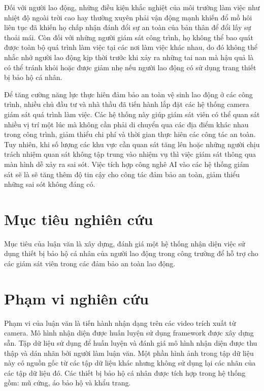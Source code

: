 Đối với người lao động, những điều kiện khắc nghiệt của môi trường làm việc như nhiệt độ ngoài trời cao hay thường xuyên phải vận động mạnh khiến đổ mồ hôi liên tục đã khiến họ chấp nhận đánh đổi sự an toàn của bản thân để đổi lấy sự thoải mái. Còn đối với những người giám sát công trình, họ không thể bao quát được toàn bộ quá trình làm việc tại các nơi làm việc khác nhau, do đó không thể nhắc nhở người lao động kịp thời trước khi xảy ra những tai nan mà hậu quả là có thể tránh khỏi hoặc được giảm nhẹ nếu người lao động có sử dụng trang thiết bị bảo hộ cá nhân.

Để tăng cường năng lực thực hiên đảm bảo an toàn vệ sinh lao động ở các công trình, nhiều chủ đầu tư và nhà thầu đã tiến hành lắp đặt các hệ thống camera giám sát quá trình làm việc. Các hệ thống này giúp giám sát viên có thể quan sát nhiều vị trí một lúc mà không cần phải di chuyển qua các địa điểm khác nhau trong công trình, giảm thiểu chi phí và thời gian thực hiên các công tác an toàn. Tuy nhiên, khi số lượng các khu vực cần quan sát tăng lên hoặc những người chịu trách nhiệm quan sát không tập trung vào nhiệm vụ  thì việc giám sát thông qua màn hình dễ xảy ra sai sót. Việc tích hợp công nghê AI vào các hệ thống giám sát sẽ là sẽ tăng thêm độ tin cậy cho công tác đảm bảo an toàn, giảm thiểu những sai sót không đáng có.

\section{Mục tiêu nghiên cứu}
Mục tiêu của luận văn là xây dựng, đánh giá một hệ thống nhận diện việc sử dụng thiết bị bảo hộ cá nhân của người lao động trong công trường để hỗ trợ cho các giám sát viên trong các đảm bảo an toàn lao động.

\section{Phạm vi nghiên cứu}
Phạm vi của luận văn là tiến hành nhận dạng trên các video trích xuất từ camera. Mô hình nhận diện được huấn luyện sử dụng framework được xây dựng sẵn. Tập dữ liệu sử dụng để huấn luyện và đánh giá mô hình nhận diện được thu thập và dán nhãn bởi người làm luận văn. Một phần hình ảnh trong tập dữ liệu này có nguồn gốc từ các tập dữ liệu khác nhưng không sử dụng lại các nhãn của các tập dữ liệu đó. Các thiết bị bảo hộ cá nhân được tích hợp trong hệ thống gồm: mũ cứng, áo bảo hộ và khẩu trang.

